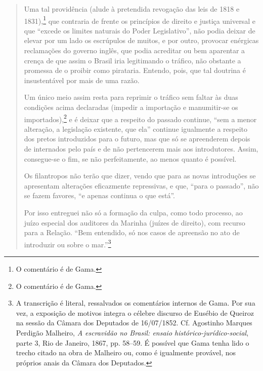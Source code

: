 \begin{quote}
Uma tal providência (alude à pretendida revogação das leis de 1818 e
1831),\footnote{O comentário é de Gama.} que contraria de frente os
princípios de direito e justiça universal e que ``excede os limites
naturais do Poder Legislativo'', não podia deixar de elevar por um lado
os escrúpulos de muitos, e por outro, provocar enérgicas reclamações do
governo inglês, que podia acreditar ou bem aparentar a crença de que
assim o Brasil iria legitimando o tráfico, não obstante a promessa de o
proibir como pirataria. Entendo, pois, que tal doutrina é insustentável
por mais de uma razão.

Um único meio assim resta para reprimir o tráfico sem faltar às duas
condições acima declaradas (impedir a importação e manumitir-se os
importados),\footnote{O comentário é de Gama.} e é deixar que a
respeito do passado continue, ``sem a menor alteração, a legislação
existente, que ela'' continue igualmente a respeito dos pretos
introduzidos para o futuro, mas que só se apreenderem depois de
internados pelo país e de não pertencerem mais aos introdutores. Assim,
consegue-se o fim, se não perfeitamente, ao menos quanto é possível.

\noindent\dotfill{}

Os filantropos não terão que dizer, vendo que para as novas introduções
se apresentam alterações eficazmente repressivas, e que, ``para o
passado'', não se fazem favores, ``e apenas continua o que está''.

\noindent\dotfill{}

Por isso entreguei não só a formação da culpa, como todo processo, ao
juízo especial dos auditores da Marinha (juízes de direito), com recurso
para a Relação. ``Bem entendido, só nos casos de apreensão no ato de
introduzir ou sobre o mar.''\footnote{A transcrição é literal,
  ressalvados os comentários internos de Gama. Por sua vez, a exposição
  de motivos integra o célebre discurso de Eusébio de Queiroz na sessão
  da Câmara dos Deputados de 16/07/1852. Cf. Agostinho Marques Perdigão
Malheiro, \emph{A escravidão no Brasil: ensaio histórico-jurídico-social},
parte 3, Rio de Janeiro, 1867, pp. 58--59. É possível que Gama tenha lido o trecho
  citado na obra de Malheiro ou, como é igualmente provável, nos
  próprios anais da Câmara dos Deputados.}
\end{quote}  

